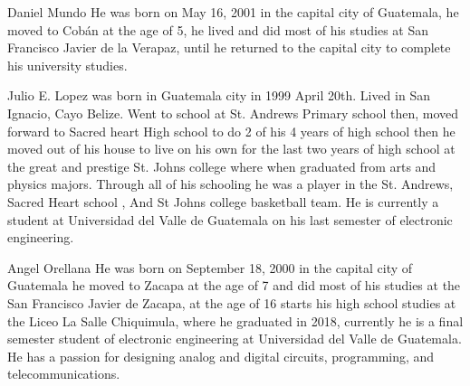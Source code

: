 
\begin{IEEEbiography}{Daniel Mundo}
    He was born on May 16, 2001 in the capital city of Guatemala, he moved to Cobán at the age of 5, he lived and did most of his studies at San Francisco Javier de la Verapaz, until he returned to the capital city to complete his university studies.
    \end{IEEEbiography}

\begin{IEEEbiography}{Julio E. Lopez}
    was born in Guatemala city in 1999 April 20th. Lived in San Ignacio, Cayo Belize. Went to school at
    St. Andrews Primary school then, moved forward to Sacred heart High school to do 2 of
    his 4 years of high school then he moved out of his house to live on his own for the last
    two years of high school at the great and prestige St. Johns college where when graduated from
    arts and physics majors. Through all of his schooling he was a player in the St. Andrews, Sacred Heart school , And St Johns
    college basketball team. He is currently a student at Universidad del Valle de Guatemala on his last semester of electronic engineering.
\end{IEEEbiography}

\begin{IEEEbiography}{Angel Orellana}
    He was born on September 18, 2000 in the capital city of Guatemala
    he moved to Zacapa at the age of 7 and did most of his studies at the
    San Francisco Javier de Zacapa, at the age of 16 starts his high school studies at the
    Liceo La Salle Chiquimula, where he graduated in 2018, currently
    he is a final semester student of 
    electronic engineering at Universidad del Valle 
    de Guatemala. He has a passion for designing analog and digital circuits, 
    programming, and telecommunications.
    \end{IEEEbiography}